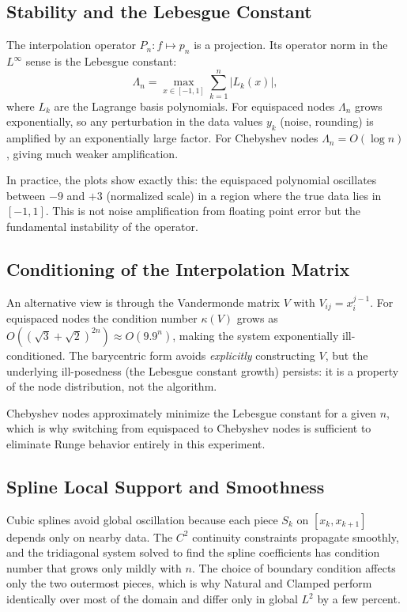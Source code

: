 \documentclass[11pt]{article}
\begin{document}
\subsection{Stability and the Lebesgue Constant}

The interpolation operator $P_n : f \mapsto p_n$ is a projection.  Its
operator norm in the $L^\infty$ sense is the Lebesgue constant:
\[
  \Lambda_n = \max_{x \in [-1,1]} \sum_{k=1}^{n} |L_k(x)|,
\]
where $L_k$ are the Lagrange basis polynomials.  For equispaced nodes
$\Lambda_n$ grows exponentially, so any perturbation in the data values $y_k$
(noise, rounding) is amplified by an exponentially large factor.  For
Chebyshev nodes $\Lambda_n = O(\log n)$, giving much weaker amplification.

In practice, the plots show exactly this: the equispaced polynomial
oscillates between $-9$ and $+3$ (normalized scale) in a region where the
true data lies in $[-1, 1]$.  This is not noise amplification from floating
point error but the fundamental instability of the operator.

\subsection{Conditioning of the Interpolation Matrix}

An alternative view is through the Vandermonde matrix $V$ with
$V_{ij} = x_i^{j-1}$.  For equispaced nodes the condition number
$\kappa(V)$ grows as $O\!\left((\sqrt{3}+\sqrt{2})^{2n}\right) \approx
O(9.9^n)$, making the system exponentially ill-conditioned.  The barycentric
form avoids \emph{explicitly} constructing $V$, but the underlying ill-posedness
(the Lebesgue constant growth) persists: it is a property of the node
distribution, not the algorithm.

Chebyshev nodes approximately minimize the Lebesgue constant for a given $n$,
which is why switching from equispaced to Chebyshev nodes is sufficient to
eliminate Runge behavior entirely in this experiment.

\subsection{Spline Local Support and Smoothness}

Cubic splines avoid global oscillation because each piece $S_k$ on
$[x_k, x_{k+1}]$ depends only on nearby data.  The $C^2$ continuity
constraints propagate smoothly, and the tridiagonal system solved to find the
spline coefficients has condition number that grows only mildly with $n$.
The choice of boundary condition affects only the two outermost pieces, which
is why Natural and Clamped perform identically over most of the domain and
differ only in global $L^2$ by a few percent.
\end{document}
